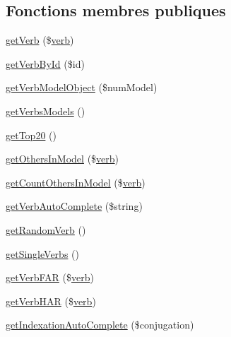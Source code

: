 \subsection*{Fonctions membres publiques}
\begin{DoxyCompactItemize}
\item 
\hyperlink{class_conjugation_data_provider_drupal_ade8bf964b9e3e855cdafcf620b183fe4}{get\+Verb} (\$\hyperlink{teibase_8php_aa8d8fadfcf4239c7aa288414da9d0ace}{verb})
\item 
\hyperlink{class_conjugation_data_provider_drupal_a1bc248d3d9e09762e4523ca230cdfdf4}{get\+Verb\+By\+Id} (\$id)
\item 
\hyperlink{class_conjugation_data_provider_drupal_a2b10d06d5bab8f2315641a27aaf2f6b6}{get\+Verb\+Model\+Object} (\$num\+Model)
\item 
\hyperlink{class_conjugation_data_provider_drupal_af59dd940255f031f93d01ed07ccccbc4}{get\+Verbs\+Models} ()
\item 
\hyperlink{class_conjugation_data_provider_drupal_a03d4d222c04d356e818db0ffd86aab24}{get\+Top20} ()
\item 
\hyperlink{class_conjugation_data_provider_drupal_a2bf49d3e0b330eb944b6b64b5faf08f9}{get\+Others\+In\+Model} (\$\hyperlink{teibase_8php_aa8d8fadfcf4239c7aa288414da9d0ace}{verb})
\item 
\hyperlink{class_conjugation_data_provider_drupal_abd938073c7a5088b9a3ecd2e7ca4fb80}{get\+Count\+Others\+In\+Model} (\$\hyperlink{teibase_8php_aa8d8fadfcf4239c7aa288414da9d0ace}{verb})
\item 
\hyperlink{class_conjugation_data_provider_drupal_a52b438cebc357aac7364f344a19a3df4}{get\+Verb\+Auto\+Complete} (\$string)
\item 
\hyperlink{class_conjugation_data_provider_drupal_af81203c54e0747ab8d802bf931b9efdf}{get\+Random\+Verb} ()
\item 
\hyperlink{class_conjugation_data_provider_drupal_aef3b4c81f910ce38cdb0faa3c6fee0c0}{get\+Single\+Verbs} ()
\item 
\hyperlink{class_conjugation_data_provider_drupal_a892823740ce22d263f1cf8c9f8447f71}{get\+Verb\+F\+AR} (\$\hyperlink{teibase_8php_aa8d8fadfcf4239c7aa288414da9d0ace}{verb})
\item 
\hyperlink{class_conjugation_data_provider_drupal_ab60b9d6d1ed760ea68943419c176e997}{get\+Verb\+H\+AR} (\$\hyperlink{teibase_8php_aa8d8fadfcf4239c7aa288414da9d0ace}{verb})
\item 
\hyperlink{class_conjugation_data_provider_drupal_a9b0687eb6a86dfc120f72db8f622b3e2}{get\+Indexation\+Auto\+Complete} (\$conjugation)

\end{DoxyCompactItemize}

